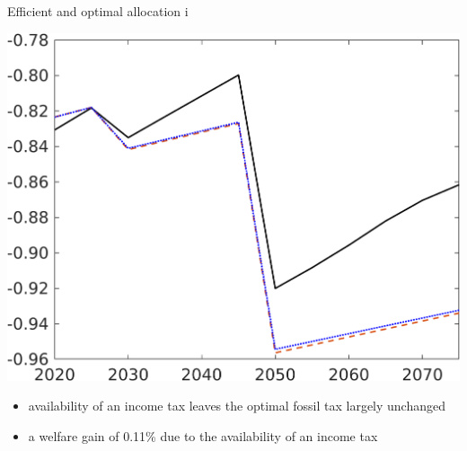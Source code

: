 \documentclass[11pt,aspectratio=169]{beamer}
\begin{document}
\begin{frame}{Efficient and optimal allocation i}
\begin{minipage}[]{0.32\textwidth}
	\includegraphics[width=1\textwidth]{../codding_model/own_basedOnFried/optimalPol_elastS_DisuSci/figures/all_1705/SWF_CompEffOPT_T_NoTaus_spillover0_noskill0_sep1_BN0_ineq0_red0_xgrowth0_zero0_countec0_etaa0.79_lgd0.png}
\end{minipage}

\vspace{6mm}
\begin{itemize}
	\item  availability of an income tax leaves the optimal fossil tax largely unchanged 
	\vspace{2mm}
	\item<2-> a welfare gain of 0.11\% due to  the availability of an income tax
\end{itemize}
\end{frame}
\end{document}
